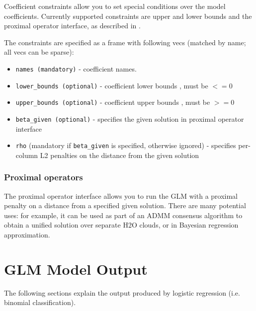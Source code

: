 Coefficient constraints allow you to set special conditions over the model coefficients. Currently supported
constraints are upper and lower bounds and the proximal operator interface, as described in .

The constraints are specified as a frame with following vecs (matched by name; all vecs can be sparse):

\begin{itemize}
\item \texttt{names (mandatory)}  - coefficient names. 
\item \texttt{lower\_bounds (optional)} - coefficient lower bounds , must be $<= 0$
\item \texttt{upper\_bounds (optional)} - coefficient upper bounds , must be $>= 0$
\item \texttt{beta\_given (optional)} - specifies the given solution in proximal operator interface
\item \texttt{rho} (mandatory if \texttt{beta\_given} is specified, otherwise ignored) - specifies per-column L2 penalties on the distance from the given solution
\end{itemize}
 
\subsubsection{Proximal operators}

The proximal operator interface allows you to run the GLM with a proximal penalty on a distance from a specified
given solution. There are many potential uses: for example, it can be used as part of an ADMM consensus algorithm
to obtain a unified solution over separate H2O clouds, or in Bayesian regression approximation.


\section{GLM Model Output}

The following sections explain the output produced by logistic regression (i.e. binomial classification).

\bigskip
\waterExampleInR


